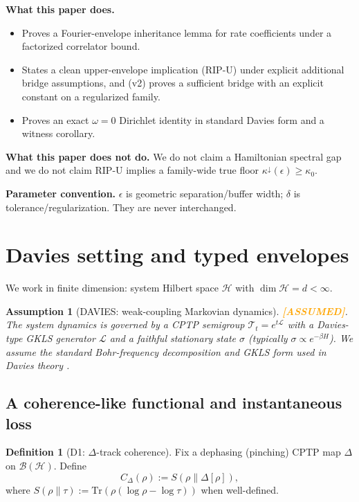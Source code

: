 \documentclass[11pt]{article}
\newtheorem{assumption}[theorem]{Assumption}
\theoremstyle{definition}
\newtheorem{definition}[theorem]{Definition}
\theoremstyle{remark}
\newcommand{\ASSUMED}{\textcolor{orange}{\textbf{[ASSUMED]}}}
\begin{document}
\textbf{What this paper does.}
\begin{itemize}
\item Proves a Fourier-envelope inheritance lemma for rate coefficients
under a factorized correlator bound.
\item States a clean upper-envelope implication (RIP-U) under explicit
additional bridge assumptions, and (v2) proves a sufficient bridge with
an explicit constant on a regularized family.
\item Proves an exact $\omega = 0$ Dirichlet identity in standard Davies
form and a witness corollary.
\end{itemize}

\textbf{What this paper does not do.} We do not claim a Hamiltonian
spectral gap and we do not claim RIP-U implies a family-wide true floor
$\kappa^{\downarrow}(\epsilon) \ge \kappa_0$.

\textbf{Parameter convention.} $\epsilon$ is geometric separation/buffer
width; $\delta$ is tolerance/regularization. They are never interchanged.

\section{Davies setting and typed envelopes}

We work in finite dimension: system Hilbert space $\mathcal{H}$ with
$\dim \mathcal{H} = d < \infty$.

\begin{assumption}[DAVIES: weak-coupling Markovian dynamics]
\label{ass:davies}
\ASSUMED. The system dynamics is governed by a CPTP semigroup
$\mathcal{T}_t = e^{t\mathcal{L}}$ with a Davies-type GKLS generator
$\mathcal{L}$ and a faithful stationary state $\sigma$ (typically
$\sigma \propto e^{-\beta H}$). We assume the standard Bohr-frequency
decomposition and GKLS form used in Davies theory \cite{Davies,BP,SL}.
\end{assumption}

\subsection{A coherence-like functional and instantaneous loss}

\begin{definition}[D1: $\Delta$-track coherence]
\label{def:cdelta}
Fix a dephasing (pinching) CPTP map $\Delta$ on $\mathcal{B}(\mathcal{H})$.
Define
\[
C_{\Delta}(\rho) := S(\rho \| \Delta[\rho]),
\]
where $S(\rho\|\tau) := \mathrm{Tr}(\rho(\log\rho - \log\tau))$ when
well-defined.
\end{definition}
\end{document}
